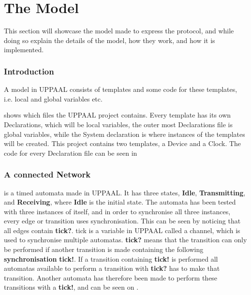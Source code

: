 \section{The Model}
This section will showcase the model made to express the protocol, and while doing so explain the details of the model, how they work, and how it is implemented.

\subsubsection{Introduction}
A model in UPPAAL consists of templates and some code for these templates, i.e. local and global variables etc.


 shows which files the UPPAAL project contains. 
Every template has its own Declarations, which will be local variables, the outer most Declarations file is global variables, while the System declaration is where instances of the templates will be created.
This project contains two templates, a Device and a Clock.
The code for every Declaration file can be seen in 

\subsubsection{A connected Network}

 is a timed automata made in UPPAAL.
It has three states, \textbf{Idle}, \textbf{Transmitting}, and \textbf{Receiving}, where \textbf{Idle} is the initial state.
The automata has been tested with three instances of itself, and in order to synchronise all three instances, every edge or transition uses synchronisation.
This can be seen by noticing that all edges contain \textbf{tick?}. 
tick is a variable in UPPAAL called a channel, which is used to synchronise multiple automatas.
\textbf{tick?} means that the transition can only be performed if another transition is made containing the following \textbf{synchronisation} \textbf{tick!}.
If a transition containing \textbf{tick!} is performed all automatas available to perform a transition with \textbf{tick?} has to make that transition.
Another automata has therefore been made to perform these transitions with a \textbf{tick!}, and can be seen on .

